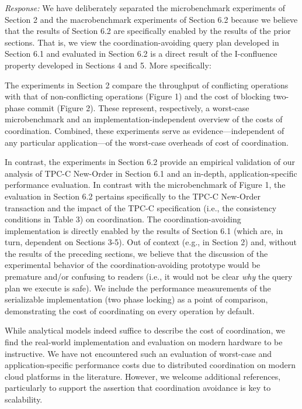 \documentclass[10pt]{article}
\newcommand{\response}[1] {\noindent\textit{Response: } #1\\}
\begin{document}
\response{We have deliberately separated the microbenchmark
  experiments of Section 2 and the macrobenchmark experiments of
  Section 6.2 because we believe that the results of Section 6.2 are
  specifically enabled by the results of the prior sections. That is,
  we view the coordination-avoiding query plan developed in Section
  6.1 and evaluated in Section 6.2 is a direct result of the
  I-confluence property developed in Sections 4 and 5. More
  specifically:

  The experiments in Section 2 compare the throughput of conflicting
  operations with that of non-conflicting operations (Figure 1) and
  the cost of blocking two-phase commit (Figure 2). These represent,
  respectively, a worst-case microbenchmark and an
  implementation-independent overview of the costs of
  coordination. Combined, these experiments serve as
  evidence---independent of any particular application---of
  the worst-case overheads of cost of coordination.

  In contrast, the experiments in Section 6.2 provide an empirical
  validation of our analysis of TPC-C New-Order in Section 6.1 and an
  in-depth, application-specific performance evaluation. In contrast
  with the microbenchmark of Figure 1, the evaluation in Section 6.2
  pertains specifically to the TPC-C New-Order transaction and the
  impact of the TPC-C specification (i.e., the consistency conditions
  in Table 3) on coordination. The coordination-avoiding
  implementation is directly enabled by the results of Section 6.1
  (which are, in turn, dependent on Sections 3-5). Out of context
  (e.g., in Section 2) and, without the results of the preceding
  sections, we believe that the discussion of the experimental
  behavior of the coordination-avoiding prototype would be premature
  and/or confusing to readers (i.e., it would not be clear
  \textit{why} the query plan we execute is safe). We include the
  performance measurements of the serializable implementation (two
  phase locking) as a point of comparison, demonstrating the cost of
  coordinating on every operation by default.

  While analytical models indeed suffice to describe the cost of
  coordination, we find the real-world implementation and evaluation
  on modern hardware to be instructive. We have not encountered such
  an evaluation of worst-case and application-specific performance
  costs due to distributed coordination on modern cloud platforms in
  the literature. However, we welcome additional references,
  particularly to support the assertion that coordination avoidance is
  key to scalability.}
\end{document}
